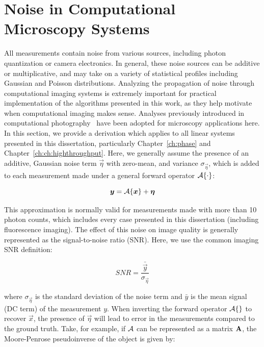\section{Noise in Computational Microscopy Systems}\label{sec:intro_noise}
All measurements contain noise from various sources, including photon quantization or camera electronics. In general, these noise sources can be additive or multiplicative, and may take on a variety of statistical profiles including Gaussian and Poisson distributions. Analyzing the propagation of noise through computational imaging systems is extremely important for practical implementation of the algorithms presented in this work, as they help motivate when computational imaging makes sense. Analyses previously introduced in computational photography~\cite{cossairt2013does} have been adopted for microscopy applications here. In this section, we provide a derivation which applies to all linear systems presented in this dissertation, particularly Chapter~\ref{ch:phase} and Chapter~\ref{ch:ch:highthroughput}. Here, we generally assume the presence of an additive, Gaussian noise term $\vec{\eta}$ with zero-mean, and variance $\sigma_{\vec{\eta}}$, which is added to each measurement made under a general forward operator $\mathcal{A}\{\cdot\}$:

\begin{equation}\label{eq:intro_forward_model}
    \bm{y} = \mathcal{A}\{\bm{x}\} + \bm{\eta}
\end{equation}

This approximation is normally valid for measurements made with more than 10 photon counts, which includes every case presented in this dissertation (including fluorescence imaging). The effect of this noise on image quality is generally represented as the signal-to-noise ratio (SNR). Here, we use the common imaging SNR definition:

\begin{equation}
    \label{eq:intro_snr}
    SNR = \frac{\bar{\vec{y}}}{\sigma_{\vec{\eta}}}
\end{equation}

\noindent where $\sigma_{\vec{\eta}}$ is the standard deviation of the noise term and $\bar{y}$ is the mean signal (DC term) of the measurement $y$. When inverting the forward operator $\mathcal{A}\{\}$ to recover $\vec{x}$, the presence of $\vec{\eta}$ will lead to error in the measurements compared to the ground truth. Take, for example, if $\mathcal{A}$ can be represented as a matrix $\mathbf{A}$, the Moore-Penrose pseudoinverse of the object is given by:

